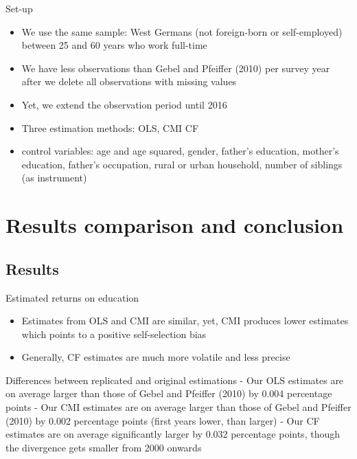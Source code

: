 \documentclass[10pt,ignorenonframetext,]{beamer}
\providecommand{\tightlist}{%
  \setlength{\itemsep}{0pt}\setlength{\parskip}{0pt}}
\begin{document}
\begin{frame}{Set-up}
\protect\hypertarget{set-up}{}

\begin{itemize}
\tightlist
\item
  We use the same sample: West Germans (not foreign-born or
  self-employed) between 25 and 60 years who work full-time
\item
  We have less observations than Gebel and Pfeiffer (2010) per survey
  year after we delete all observations with missing values
\item
  Yet, we extend the observation period until 2016
\item
  Three estimation methods: OLS, CMI CF
\item
  control variables: age and age squared, gender, father's education,
  mother's education, father's occupation, rural or urban household,
  number of siblings (as instrument)
\end{itemize}

\end{frame}

\hypertarget{results-comparison-and-conclusion}{%
\section{Results comparison and
conclusion}\label{results-comparison-and-conclusion}}

\hypertarget{results}{%
\subsection{Results}\label{results}}

\begin{frame}{Estimated returns on education}
\protect\hypertarget{estimated-returns-on-education}{}

\begin{itemize}
\tightlist
\item
  Estimates from OLS and CMI are similar, yet, CMI produces lower
  estimates which points to a positive self-selection bias
\item
  Generally, CF estimates are much more volatile and less precise
\end{itemize}

Differences between replicated and original estimations - Our OLS
estimates are on average larger than those of Gebel and Pfeiffer (2010)
by 0.004 percentage points - Our CMI estimates are on average larger
than those of Gebel and Pfeiffer (2010) by 0.002 percentage points
(first years lower, than larger) - Our CF estimates are on average
significantly larger by 0.032 percentage points, though the divergence
gets smaller from 2000 onwards

\end{frame}
\end{document}
